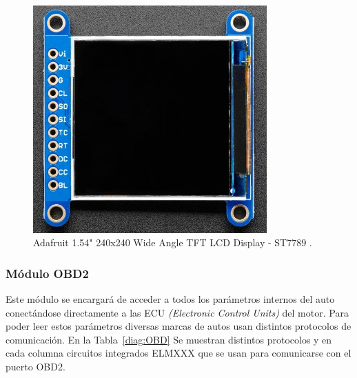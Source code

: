 \begin{figure}[hbtp!]
\centering
\includegraphics[width=0.8\textwidth]{IPS_LCD.jpg}
\caption[Adafruit 1.54" 240x240 Wide Angle TFT LCD Display - ST7789]{Adafruit 1.54" 240x240 Wide Angle TFT LCD Display - ST7789 \cite{IPS_LCD}.}
\label{fig:Display}
\end{figure}











\subsubsection{Módulo OBD2}
Este módulo se encargará de acceder a todos los parámetros internos del auto conectándose directamente a las ECU \textit{(Electronic Control Units)} del motor. Para poder leer estos parámetros diversas marcas de autos usan distintos protocolos de comunicación. En la Tabla~\ref{diag:OBD} Se muestran distintos protocolos y en cada columna circuitos integrados ELMXXX que se usan para comunicarse con el puerto OBD2.

